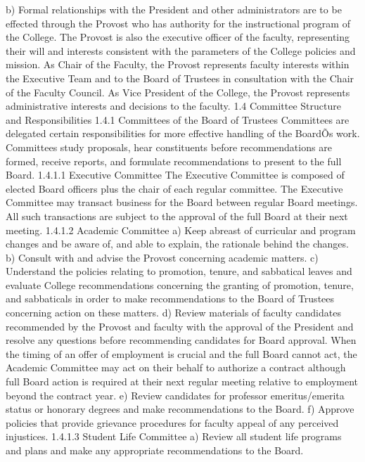 \documentclass[letterpaper, 11pt]{article}
\begin{document}
b) Formal relationships with the President and other administrators are to be effected through the Provost who has authority for the instructional program of the College.  The Provost is also the executive officer of the faculty, representing their will and interests consistent with the parameters of the College policies and mission.  As Chair of the Faculty, the Provost represents faculty interests within the Executive Team and to the Board of Trustees in consultation with the Chair of the Faculty Council.  As Vice President of the College, the Provost represents administrative interests and decisions to the faculty.
1.4 Committee Structure and Responsibilities
1.4.1 Committees of the Board of Trustees
   Committees are delegated certain responsibilities for more effective handling of the BoardÕs work.  Committees study proposals, hear constituents before recommendations are formed, receive reports, and formulate recommendations to present to the full Board.
1.4.1.1 Executive Committee
   The Executive Committee is composed of elected Board officers plus the chair of each regular committee.  The Executive Committee may transact business for the Board between regular Board meetings.  All such transactions are subject to the approval of the full Board at their next meeting.
1.4.1.2 Academic Committee
a) Keep abreast of curricular and program changes and be aware of, and able to explain, the rationale behind the changes.
b) Consult with and advise the Provost concerning academic matters.
c) Understand the policies relating to promotion, tenure, and sabbatical leaves and evaluate College recommendations concerning the granting of promotion, tenure, and sabbaticals in order to make recommendations to the Board of Trustees concerning action on these matters.
d) Review materials of faculty candidates recommended by the Provost and faculty with the approval of the President and resolve any questions before recommending candidates for Board approval.  When the timing of an offer of employment is crucial and the full Board cannot act, the Academic Committee may act on their behalf to authorize a contract although full Board action is required at their next regular meeting relative to employment beyond the contract year.
e) Review candidates for professor emeritus/emerita status or honorary degrees and make recommendations to the Board.
f) Approve policies that provide grievance procedures for faculty appeal of any perceived injustices.
1.4.1.3 Student Life Committee
a) Review all student life programs and plans and make any appropriate recommendations to the Board.
\end{document}
